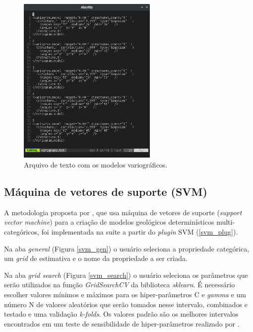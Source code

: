 \begin{figure}[H]
	\caption{\label{vario_model_txt}Arquivo de texto com os modelos variográficos.}
	\centering
		\includegraphics[width=0.6\textwidth]{apendice/imagens/variograms.png}
\end{figure}

\subsection{Máquina de vetores de suporte (SVM)}

A metodologia proposta por , que usa máquina de vetores de suporte (\textit{support vector machine}) para a criação de modelos geológicos determinísticos multi-categóricos, foi implementada na suite a partir do \textit{plugin} SVM (\autoref{svm_plug}).

Na aba \textit{general} (Figura \autoref{svm_gen}) o usuário seleciona a propriedade categórica, um \textit{grid} de estimativa e o nome da propriedade a ser criada.

Na aba \textit{grid search} (Figura \autoref{svm_search}) o usuário seleciona os parâmetros que serão utilizados na função \textit{GridSearchCV} da biblioteca \textit{sklearn}. É necessário escolher valores mínimos e máximos para os hiper-parâmetros C e \textit{gamma} e um número N de valores aleatórios que serão tomados nesse intervalo, combinados e testado e uma validação \textit{k-folds}. Os valores padrão são os melhores intervalos encontrados em um teste de sensibilidade de hiper-parâmetros realizado por .

